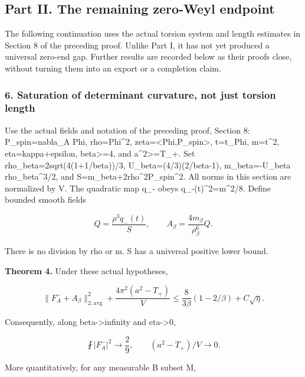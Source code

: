 \documentclass[
  10pt,
]{article}
\begin{document}
\hypertarget{part-ii.-the-remaining-zero-weyl-endpoint}{%
\subsection{Part II. The remaining zero-Weyl
endpoint}\label{part-ii.-the-remaining-zero-weyl-endpoint}}

The following continuation uses the actual torsion system and length
estimates in Section 8 of the preceding proof. Unlike Part I, it has not
yet produced a universal zero-end gap. Further results are recorded
below as their proofs close, without turning them into an export or a
completion claim.

\hypertarget{saturation-of-determinant-curvature-not-just-torsion-length}{%
\subsubsection{6. Saturation of determinant curvature, not just torsion
length}\label{saturation-of-determinant-curvature-not-just-torsion-length}}

Use the actual fields and notation of the preceding proof, Section 8:
P\_spin=nabla\_A Phi, rho=\textbar Phi\textbar\^{}2,
zeta=\textless Phi,P\_spin\textgreater, t=t\_Phi,
m=\textbar t\textbar\^{}2, eta=kappa+epsilon, beta\textgreater=4, and
a\^{}2\textgreater=T\_+. Set rho\_beta=2sqrt(4(1+1/beta))/3,
U\_beta=(4/3)(2/beta-1), m\_beta=-U\_beta rho\_beta\^{}3/2, and
S=m\_beta+2rho\^{}2\textbar P\_spin\textbar\^{}2. All norms in this
section are normalized by V. The quadratic map q\_- obeys
\textbar q\_-(t)\textbar\^{}2=m\^{}2/8. Define bounded smooth fields

\[
 Q=\frac{\rho^3q_-(t)}S,\qquad
 A_\beta=\frac{4m_\beta}{\rho_\beta^6}Q.                \tag{6.1}
\]

There is no division by rho or m. S has a universal positive lower
bound.

\textbf{Theorem 4.} Under these actual hypotheses,

\[
 \boxed{\|F_A^-+A_\beta\|_{2,\mathrm{avg}}^2
       +\frac{4\pi^2(a^2-T_+)}V
       \le\frac8{3\beta}(1-2/\beta)+C\sqrt\eta.}       \tag{6.2}
\]

Consequently, along beta-\textgreater infinity and eta-\textgreater0,

\[
 \fint|F_A^-|^2\longrightarrow\frac29,
 \qquad (a^2-T_+)/V\longrightarrow0.                   \tag{6.3}
\]

More quantitatively, for any measurable B subset M,
\end{document}
